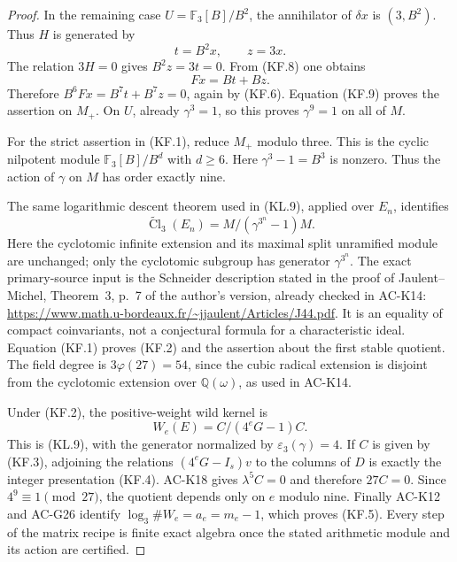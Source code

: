 \begin{proof}
In the remaining case $U=\mathbb F_3[B]/B^2$,
the annihilator of $\delta x$ is $(3,B^2)$.
Thus $H$ is generated by
\[
                         t=B^2x,\qquad z=3x.
\]
The relation $3H=0$ gives $B^2z=3t=0$.
From (KF.8) one obtains
\[
                         Fx=Bt+Bz.
\]
Therefore $B^6Fx=B^7t+B^7z=0$, again by (KF.6).
Equation (KF.9) proves the assertion on $M_+$.
On $U$, already $\gamma^3=1$, so this proves
$\gamma^9=1$ on all of $M$.

For the strict assertion in (KF.1), reduce $M_+$ modulo
three.  This is the cyclic nilpotent module
$\mathbb F_3[B]/B^d$ with $d\geq6$.
Here $\gamma^3-1=B^3$ is nonzero.  Thus the action of
$\gamma$ on $M$ has order exactly nine.

The same logarithmic descent theorem used in (KL.9), applied
over $E_n$, identifies
\[
 \widetilde{\operatorname{Cl}}_3(E_n)
                 =M/(\gamma^{3^n}-1)M.              \tag{KF.11}
\]
Here the cyclotomic infinite extension and its maximal split
unramified module are unchanged; only the cyclotomic subgroup
has generator $\gamma^{3^n}$.
The exact primary-source input is the Schneider description
stated in the proof of Jaulent--Michel, Theorem~3, p.~7 of
the author's version, already checked in AC-K14:
\url{https://www.math.u-bordeaux.fr/~jjaulent/Articles/J44.pdf}.
It is an equality of compact coinvariants, not a conjectural
formula for a characteristic ideal.
Equation (KF.1) proves (KF.2) and the assertion about the
first stable quotient.  The field degree is
$3\varphi(27)=54$, since the cubic radical extension is
disjoint from the cyclotomic extension over
$\mathbb Q(\omega)$, as used in AC-K14.

Under (KF.2), the positive-weight wild kernel is
\[
              W_e(E)=C/(4^eG-1)C.                   \tag{KF.12}
\]
This is (KL.9), with the generator normalized by
$\varepsilon_3(\gamma)=4$.
If $C$ is given by (KF.3), adjoining the relations
$(4^eG-I_s)v$ to the columns of $D$ is exactly the
integer presentation (KF.4).
AC-K18 gives $\lambda^5C=0$ and therefore $27C=0$.
Since $4^9\equiv1\pmod{27}$, the quotient depends only
on $e$ modulo nine.  Finally AC-K12 and AC-G26 identify
$\log_3\#W_e=a_e=m_e-1$, which proves (KF.5).
Every step of the matrix recipe is finite exact algebra once
the stated arithmetic module and its action are certified.
\end{proof}

